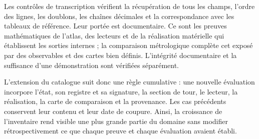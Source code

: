 Les contrôles de transcription vérifient la récupération de tous les
champs, l'ordre des lignes, les doublons, les chaînes décimales et la
correspondance avec les tableaux de référence. Leur portée est documentaire.
Ce sont les preuves mathématiques de l'atlas, des lecteurs et de la réalisation matérielle
qui établissent les sorties internes ; la comparaison métrologique
complète cet exposé par des observables et des cartes bien définis.
L'intégrité documentaire et la suffisance d'une démonstration sont
vérifiées séparément.

L'extension du catalogue suit donc une règle cumulative :
une nouvelle évaluation incorpore l'état, son registre et sa signature, la section
de tour, le lecteur, la réalisation, la carte de comparaison et la
provenance. Les cas précédents conservent leur contenu et leur date de
coupure. Ainsi, la croissance de l'inventaire rend visible une plus grande partie
du domaine sans modifier rétrospectivement ce que chaque preuve et
chaque évaluation avaient établi.
